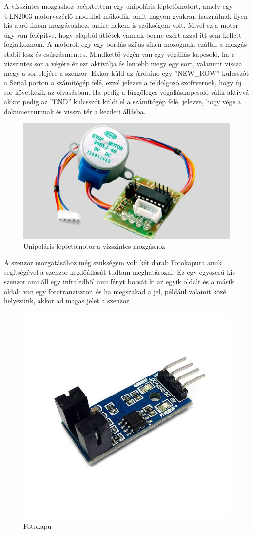 \documentclass[]{thesis-ekf}
\theoremstyle{definition}
\theoremstyle{remark}
\begin{document}
A vízszintes mozgáshoz beépítettem egy unipoláris léptetőmotort, amely egy ULN2003 motorvezérlő modullal működik, amit nagyon gyakran használnak ilyen kis apró finom mozgásokhoz, amire nekem is szükségem volt. Mivel ez a motor úgy van felépítve, hogy alapból áttétek vannak benne ezért azzal itt sem kellett foglalkoznom. A motorok egy egy bordás szíjas sínen mozognak, ezáltal a mozgás stabil lesz és csúszásmentes. Mindkettő végén van egy végállás kapcsoló, ha a vízszintes sor a végére ér ezt aktiválja és lentebb megy egy sort, valamint vissza megy a sor elejére a szenzor. Ekkor küld az Arduino egy ''NEW\_ROW'' kulcsszót a Serial porton a számítógép felé, ezzel jelezve a feldolgozó szoftvernek, hogy új sor következik az olvasásban. Ha pedig a függőleges végálláskapcsoló válik aktívvá akkor pedig az ''END'' kulcsszót küldi el a számítógép felé, jelezve, hogy vége a dokumentumnak és vissza tér a kezdeti állásba.

\begin{figure}[th!]
	\centering
	\includegraphics[width=0.5\linewidth]{28BYJ-48-modul-ULN2003}
	\caption[Unipoláris léptetőmotor]{Unipoláris léptetőmotor a vízszintes mozgáshoz}
	\label{fig:28byj-48-modul-uln2003}
\end{figure}

A szenzor mozgatásához még szükségem volt két darab Fotokapura amik segítségével a szenzor kezdőállását tudtam meghatározni. Ez egy egyszerű kis szenzor ami áll egy infraledből ami fényt bocsát ki az egyik oldalt és a másik oldalt van egy fototranzisztor, és ha megszakad a jel, például valamit közé helyezünk, akkor ad magas jelet a szenzor. 
 \begin{figure}[th!]
 	\centering
 	\includegraphics[width=0.4\linewidth]{MH-Infrared-Speed-Sensor-Module}
 	\caption[Infravörös kapu]{Fotokapu}
 	\label{fig:mh-infrared-speed-sensor-module}
 \end{figure}
\end{document}

